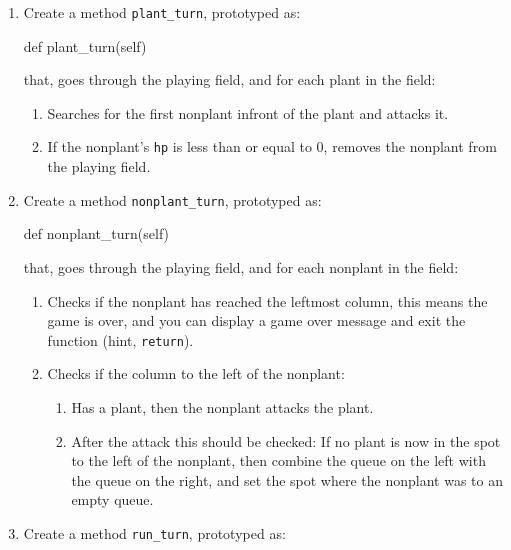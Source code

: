\documentclass{42-en}
\begin{document}
\makeheaderfiles
        \begin{enumerate}\itemsep7pt
\item Create a method \texttt{plant\_turn}, prototyped as:
\begin{42pycode}
def plant_turn(self)
\end{42pycode}
that, goes through the playing field, and for each plant in the field:
 \begin{enumerate}\itemsep7pt
    \item Searches for the first nonplant infront of the plant and attacks it.
    \item If the nonplant's \texttt{hp} is less than or equal to 0, removes the nonplant from the playing field.
  \end{enumerate}
\item Create a method \texttt{nonplant\_turn}, prototyped as:
\begin{42pycode}
def nonplant_turn(self)
\end{42pycode}
that, goes through the playing field, and for each nonplant in the field:
 \begin{enumerate}\itemsep7pt
    \item Checks if the nonplant has reached the leftmost column, this means the game is over, and you can display a game over message and exit the function (hint, \texttt{return}).
    \item Checks if the column to the left of the nonplant:
        \begin{enumerate}\itemsep7pt
            \item Has a plant, then the nonplant attacks the plant.
            \item After the attack this should be checked: If no plant is now in the spot to the left of the nonplant, then combine the queue on the left with the queue on the right, and set the spot where the nonplant was to an empty queue.
         \end{enumerate}   
  \end{enumerate}
\item Create a method \texttt{run\_turn}, prototyped as:

\end{enumerate}
\end{document}
